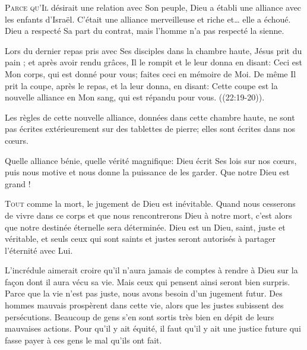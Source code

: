 \lettrine{P}{arce qu'Il} désirait une relation avec Son peuple,
 Dieu a établi une alliance avec les enfants d'Israël.
 C'était une alliance merveilleuse et riche et\dots{} elle a échoué.
 Dieu a respecté Sa part du contrat, mais l'homme n'a pas respecté la sienne. 


Lors du dernier repas pris avec Ses disciples dans la chambre haute,
 Jésus \Og prit du pain ; et après avoir rendu grâces, Il le rompit
 et le leur donna en disant: Ceci est Mon corps, qui est donné pour vous;
 faites ceci en mémoire de Moi. De même Il prit la coupe, après le repas,
 et la leur donna, en disant: Cette coupe est la nouvelle alliance
 en Mon sang, qui est répandu pour vous. \Fg{} ((22:19-20)). 

Les règles de cette nouvelle alliance, données dans cette chambre haute,
 ne sont pas écrites extérieurement sur des tablettes de pierre;
 elles sont écrites dans nos c\oe{}urs. 

Quelle alliance bénie, quelle vérité magnifique:
 Dieu écrit Ses lois sur nos c\oe{}urs, puis nous motive et nous donne
 la puissance de les garder. Que notre Dieu est grand ! 

\dvrule






\lettrine{T}{out} comme la mort, le jugement de Dieu est inévitable.
 Quand nous cesserons de vivre dans ce corps et que nous rencontrerons
 Dieu à notre mort, c'est alors que notre destinée éternelle
 sera déterminée. Dieu est un Dieu, saint, juste et véritable,
 et seuls ceux qui sont saints et justes seront autorisés
 à partager l'éternité avec Lui. 


L'incrédule aimerait croire qu'il n'aura jamais de comptes à rendre à Dieu
 sur la fa\c{c}on dont il aura vécu sa vie. Mais ceux qui pensent ainsi
 seront bien surpris. Parce que la vie n'est pas juste, nous avons besoin
 d'un jugement futur. Des hommes mauvais prospèrent dans cette vie,
 alors que les justes subissent des persécutions. Beaucoup de gens
 s'en sont sortis très bien en dépit de leurs mauvaises actions.
 Pour qu'il y ait équité, il faut qu'il y ait une justice future
 qui fasse payer à ces gens le mal qu'ils ont fait. 

